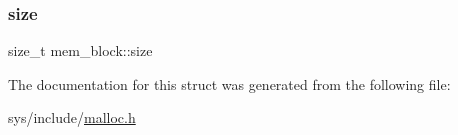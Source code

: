 \mbox{\label{structmem__block_a5ff4ee5dcd970bbc4951eb108c5eec4b}} 
\subsubsection{\texorpdfstring{size}{size}}
{\footnotesize\ttfamily size\+\_\+t mem\+\_\+block\+::size}



The documentation for this struct was generated from the following file\+:\begin{DoxyCompactItemize}
\item 
sys/include/\hyperlink{malloc_8h}{malloc.\+h}\end{DoxyCompactItemize}
